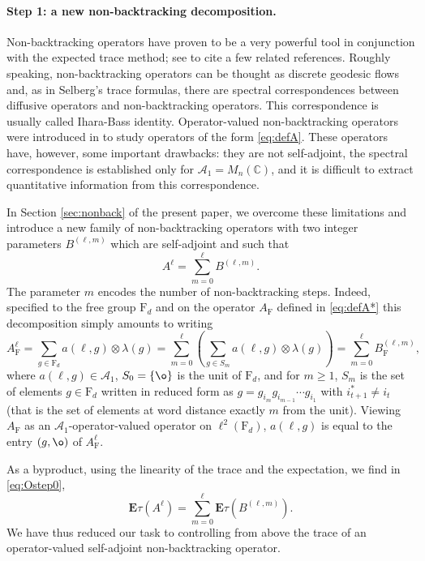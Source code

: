 \documentclass[11pt]{article}
\renewcommand{\star}{{\mathrm{F}}}
\newcommand{\cA}{\mathcal{A}}
\newcommand{\dE}{\mathbf {E}}
\newcommand{\dF}{\mathrm{F}}
\newcommand{\dC}{\mathbb {C}}
\newcommand{\PAR}[1]{{{\left(#1\right)}}} %
\newcommand{\1}{1\!\!{\sf I}}
\begin{document}
\paragraph{Step 1: a new non-backtracking decomposition. } Non-backtracking operators have proven to be a very powerful tool in conjunction with the expected trace method; see \cite{Friedman1996,MR2377835,MR2647136,MR4116720,BLM,FrKo,MR4203039} to cite a few related references. Roughly speaking, non-backtracking operators can be thought as discrete geodesic flows and, as in Selberg's trace formulas, there are spectral correspondences between diffusive operators and non-backtracking operators. This correspondence is usually called Ihara-Bass identity. Operator-valued non-backtracking operators were introduced in \cite{MR4024563,BC2} to study operators of the form \eqref{eq:defA}. These operators have, however, some important drawbacks: they are not self-adjoint, the spectral correspondence is established only for $\cA_1 = M_n(\dC)$, and it is difficult to extract quantitative information from this correspondence.

In Section \ref{sec:nonback} of the present paper, we overcome these limitations and introduce a new family of non-backtracking operators with two integer parameters $B^{(\ell,m)}$ which are self-adjoint and such that 
\begin{equation}\label{eq:-1decompA}
A^\ell = \sum_{m=0}^\ell B^{(\ell,m)}.
\end{equation}
The parameter $m$ encodes the number of non-backtracking steps. Indeed, specified to the free group $\dF_d$ and on the operator $A_\star$ defined in \eqref{eq:defA*} this decomposition simply amounts to writing
\begin{equation}\label{eq:OdecompA}
A_\star^\ell = \sum_{g \in \dF_d} a(\ell,g) \otimes \lambda(g)  = \sum_{m=0}^{\ell} \PAR{ \sum_{g \in S_m} a(\ell,g) \otimes \lambda(g)}  = \sum_{m=0}^\ell B_\star^{(\ell,m)},
\end{equation}
where $a(\ell,g) \in \cA_1 $, $S_0 = \{\o\}$ is the unit of $\dF_d$, and for $m \geq 1$, $S_m$ is the set of elements $g \in \dF_d$ written in reduced form as $g = g_{i_m}g_{i_{m-1}} \cdots g_{i_1}$ with $i_{t+1}^* \ne i_t$ (that is the set of elements at word distance exactly $m$ from the unit). Viewing $A_\star$ as an $\cA_1$-operator-valued operator on $\ell^2(\dF_d)$, $a(\ell,g)$ is equal to the entry $(g,\o)$ of $A_\star^\ell$. 

As a byproduct, using the linearity of the trace and the expectation, we find in \eqref{eq:Ostep0}, 
\begin{equation}\label{eq:Ostep1}
\dE \tau \PAR{  A^\ell }  = \sum_{m=0}^\ell \dE  \tau \PAR{  B^{(\ell,m)} }. 
\end{equation}
We have thus reduced our task to controlling from above the trace of an operator-valued self-adjoint non-backtracking operator.
\end{document}
